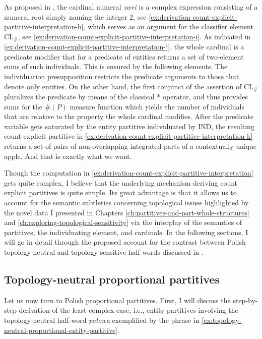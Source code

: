 	As proposed in , 
    the cardinal numeral \textit{zwei} is a complex expression consisting of a numeral root simply naming the integer 2, see \ref{ex:derivation-count-explicit-partitive-interpretation-h}, which serves as an argument for the classifier element CL$_\#$, see \ref{ex:derivation-count-explicit-partitive-interpretation-i}. As indicated in \ref{ex:derivation-count-explicit-partitive-interpretation-j}, the whole cardinal is a predicate modifier that for a predicate of  entities returns a set of two-element sums of such individuals. This is ensured by the following elements. The individuation presupposition restricts the predicate arguments to those that denote only  entities. On the other hand, the first conjunct of the assertion of CL$_\#$ pluralizes the predicate by means of the classical * operator, and thus provides sums for the $\#(P)$ measure function which yields the number of individuals that are  relative to the property the whole cardinal modifies. After the predicate variable gets saturated by the entity partitive individuated by IND, the resulting count explicit partitive in \ref{ex:derivation-count-explicit-partitive-interpretation-k} returns a set of pairs of non-overlapping integrated parts of a contextually unique apple. And that is exactly what we want.
	
	Though the computation in \ref{ex:derivation-count-explicit-partitive-interpretation} gets quite complex, I believe that the underlying mechanism deriving count explicit partitives is quite simple. Its great advantage is that it allows us to account for the semantic subtleties concerning topological issues highlighted by the novel data I presented in Chapters \ref{ch:partitives-and-part-whole-structures} and \ref{ch:exploring-topological-sensitivity} via the interplay of the semantics of partitives, the individuating element, and cardinals. In the following sections, I will go in detail through the proposed account for the contrast between Polish topology-neutral and topology-sensitive half-words discussed in  .
	
	\subsection{Topology-neutral proportional partitives}\label{sec:topology-neutral-proportional-partitives}
	
	Let us now turn to Polish proportional partitives. First, I will discuss the step-by-step derivation of the least complex case, i.e., entity partitives involving the topology-neutral half-word \textit{połowa} exemplified by the phrase in \ref{ex:topology-neutral-proportional-entity-partitive}. 
	
